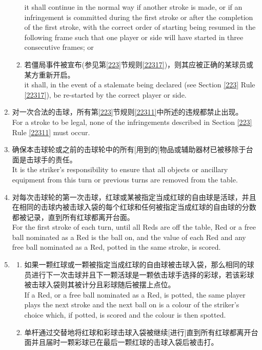 \begin{enumerate}[label=(\alph*)]
\begin{enumerate}[label=(\roman*)]
        it shall continue in the normal way if another stroke is made, or if an infringement is committed during the first stroke or after the completion of the first stroke, with the correct order of starting being resumed in the following frame such that one player or side will have started in three consecutive frames; or
        \item \label{2233diii}若僵局事件被宣布(参见第\ref{223}节规则\ref{22317})，则其应被正确的某球员或某方重新开启。\\
        it shall, in the event of a stalemate being declared (see Section \ref{223} Rule \ref{22317}), be re-started by the correct player or side.
    \end{enumerate}
    \item 对一次合法的击球，所有第\ref{223}节规则\ref{22311}中所述的违规都禁止出现。\\
    For a stroke to be legal, none of the infringements described in Section \ref{223} Rule \ref{22311} must occur.
    \item 确保本击球轮或之前的击球轮中的所有[用到的]物品或辅助器材已被移除于台面是击球手的责任。\\
    It is the striker's responsibility to ensure that all objects or ancillary equipment from this turn or previous turns are removed from the table.
    \item 对每次击球轮的第一次击球，红球或某被指定当成红球的自由球是活球，并且在相同的击球内被击球入袋的每个红球和任何被指定当成红球的自由球的分数都被记录，直到所有红球都离开台面。\\
    For the first stroke of each turn, until all Reds are off the table, Red or a free ball nominated as a Red is the ball on, and the value of each Red and any free ball nominated as a Red, potted in the same stroke, is scored.
    \item \label{2233h}
    \begin{enumerate}[label=(\roman*)]
        \item 如果一颗红球或一颗被指定当成红球的自由球被击球入袋，那么相同的球员进行下一次击球并且下一颗活球是一颗依击球手选择的彩球，若该彩球被击球入袋则其被计分且彩球随后被摆上点位。\\
        If a Red, or a free ball nominated as a Red, is potted, the same player plays the next stroke and the next ball on is a colour of the striker's choice which, if potted, is scored and the colour is then spotted.
        \item 单杆通过交替地将红球和彩球击球入袋被继续[进行]直到所有红球都离开台面并且届时一颗彩球已在最后一颗红球的击球入袋后被击打。\\

\end{enumerate}
\end{enumerate}
